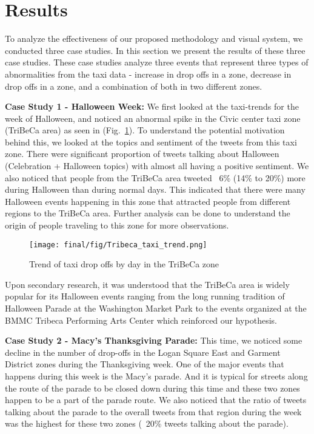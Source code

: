 \section{Results}
To analyze the effectiveness of our proposed methodology and visual system, we conducted three case studies. In this section we present the results of these three case studies. These case studies analyze three events that represent three types of abnormalities from the taxi data - increase in drop offs in a zone, decrease in drop offs in a zone, and a combination of both in two different zones.

\textbf{Case Study 1 - Halloween Week: } We first looked at the taxi-trends for the week of Halloween, and noticed an abnormal spike in the Civic center taxi zone (TriBeCa area) as seen in (Fig.~\ref{fig:tribecatrend}). To understand the potential motivation behind this, we looked at the topics and sentiment of the tweets from this taxi zone. There were significant proportion of tweets talking about Halloween (Celebration + Halloween topics) with almost all having a positive sentiment. We also noticed that people from the TriBeCa area tweeted ~6\% (14\% to 20\%) more during Halloween than during normal days. This indicated that there were many Halloween events happening in this zone that attracted people from different regions to the TriBeCa area. Further analysis can be done to understand the origin of people traveling to this zone for more observations.

\begin{figure}[h]
 \centering %
 \texttt{[image: final/fig/Tribeca\_taxi\_trend.png]}
 \caption{Trend of taxi drop offs by day in the TriBeCa zone}
 \label{fig:tribecatrend}
\end{figure}

Upon secondary research, it was understood that the TriBeCa area is widely popular for its Halloween events \cite{tribecanews} ranging from the long running tradition of Halloween Parade at the Washington Market Park to the events organized at the BMMC Tribeca Performing Arts Center which reinforced our hypothesis.


\textbf{Case Study 2 - Macy's Thanksgiving Parade: } This time, we noticed some decline in the number of drop-offs in the Logan Square East and Garment District zones during the Thanksgiving week. One of the major events that happens during this week is the Macy's parade. And it is typical for streets along the route of the parade to be closed down during this time and these two zones happen to be a part of the parade route. We also noticed that the ratio of tweets talking about the parade to the overall tweets from that region during the week was the highest for these two zones (~20\% tweets talking about the parade).


